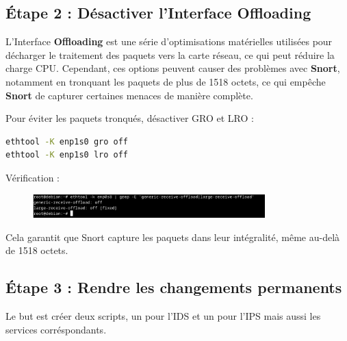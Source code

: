 \documentclass[12pt]{article}
\begin{document}
\subsection*{Étape 2 : Désactiver l’Interface Offloading}

L’Interface \textbf{Offloading} est une série d’optimisations matérielles utilisées pour décharger le traitement des paquets vers la carte réseau, ce qui peut réduire la charge CPU. Cependant, ces options peuvent causer des problèmes avec \textbf{Snort}, notamment en tronquant les paquets de plus de 1518 octets, ce qui empêche \textbf{Snort} de capturer certaines menaces de manière complète.

Pour éviter les paquets tronqués, désactiver GRO et LRO :

\begin{lstlisting}[language=bash]
ethtool -K enp1s0 gro off
ethtool -K enp1s0 lro off
\end{lstlisting}

Vérification :

\begin{figure}[H] %
    \centering
    \includegraphics[width=0.8\textwidth]{captures/Pasted image 20250604080003.png}
    \label{fig:mon_image}
\end{figure}


\noindent Cela garantit que Snort capture les paquets dans leur intégralité, même au-delà de 1518 octets.

\subsection*{Étape 3 : Rendre les changements permanents}
Le but est créer deux scripts, un pour l'IDS et un pour l'IPS mais aussi les services corréspondants.
\end{document}
